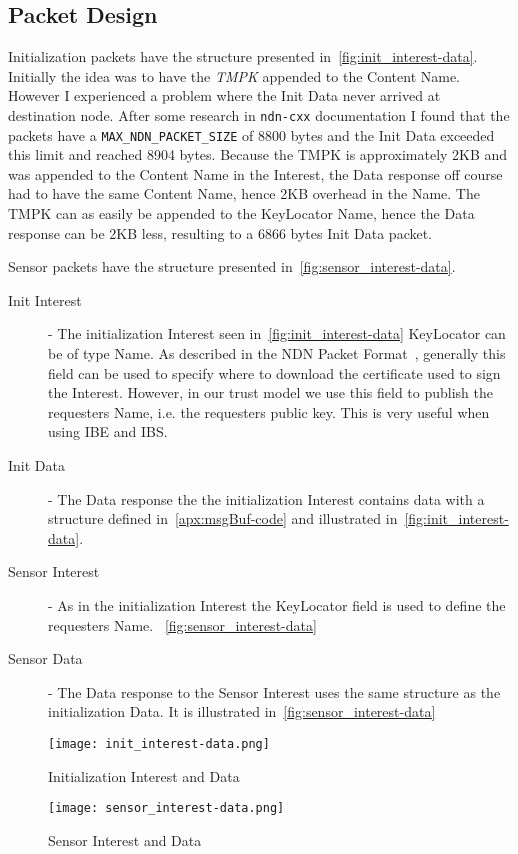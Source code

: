 \subsection{Packet Design}
Initialization packets have the structure presented in~\autoref{fig:init_interest-data}.
Initially the idea was to have the \textit{\gls{TMPK}} appended to the Content Name. 
However I experienced a problem where the Init Data never arrived at destination node. 
After some research in \texttt{ndn-cxx} documentation I found that the packets have a \texttt{MAX\_NDN\_PACKET\_SIZE} of 8800 bytes and the Init Data exceeded this limit and reached 8904 bytes.
Because the \gls{TMPK} is approximately 2\gls{KB} and was appended to the Content Name in the Interest, the Data response off course had to have the same Content Name, hence 2\gls{KB} overhead in the Name. 
The \gls{TMPK} can as easily be appended to the KeyLocator Name, hence the Data response can be 2\gls{KB} less, resulting to a 6866 bytes Init Data packet.

Sensor packets have the structure presented in~\autoref{fig:sensor_interest-data}.
\begin{description}
	\item[Init Interest] - 
  The initialization Interest seen in~\autoref{fig:init_interest-data}
  KeyLocator can be of type Name. 
  As described in the \gls{NDN} Packet Format~\cite{ndnpacketformat}, generally this field can be used to specify where to download the certificate used to sign the Interest.
  However, in our trust model we use this field to publish the requesters Name, i.e. the requesters public key. 
  This is very useful when using \gls{IBE} and \gls{IBS}.
	\item[Init Data] - 
  The Data response the the initialization Interest contains data with a structure defined in~\autoref{apx:msgBuf-code} and illustrated in~\autoref{fig:init_interest-data}.
	\item[Sensor Interest] -
	As in the initialization Interest the KeyLocator field is used to define the requesters Name. ~\autoref{fig:sensor_interest-data}
	\item[Sensor Data] - 
  The Data response to the Sensor Interest uses the same structure as the initialization Data. It is illustrated in~\autoref{fig:sensor_interest-data}
\end{description}

\begin{figure}[ht]
  \centering
  \texttt{[image: init\_interest-data.png]}
  \caption{Initialization Interest and Data}
  \label{fig:init_interest-data}
\end{figure}

\begin{figure}[ht]
  \centering
  \texttt{[image: sensor\_interest-data.png]}
  \caption{Sensor Interest and Data}
  \label{fig:sensor_interest-data}
\end{figure}




